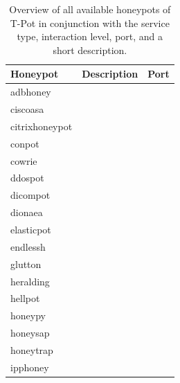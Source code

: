 \begin{table}
    \centering
    \caption[Overview honeypots of T-Pot]{Overview of all available honeypots of T-Pot in conjunction with the service type, interaction level, port, and a short description.}
    \begin{tabularx}{\linewidth}{l|l|l}
        \toprule
        \textbf{Honeypot}                        & \textbf{Description} & \textbf{Port} \\
        \hline
        adbhoney \cite{adbhoney2021}             &                      &               \\
        ciscoasa \cite{cymmetria2018}            &                      &               \\
        citrixhoneypot \cite{citrixhoneypot2020} &                      &               \\
        conpot \cite{conpot2021}                 &                      &               \\
        cowrie \cite{cowire2021}                 &                      &               \\
        ddospot \cite{ddosspot2021}              &                      &               \\
        dicompot \cite{dicompot2021}             &                      &               \\
        dionaea \cite{dionaea2021}               &                      &               \\
        elasticpot \cite{elasticpot2021}         &                      &               \\
        endlessh \cite{endlessh2021}             &                      &               \\
        glutton \cite{glutton2021}               &                      &               \\
        heralding \cite{heralding2021}           &                      &               \\
        hellpot \cite{hellpot2021}               &                      &               \\
        honeypy \cite{honeysap2021}              &                      &               \\
        honeysap \cite{honeysap2021}             &                      &               \\
        honeytrap \cite{honeytrap2021}           &                      &               \\
        ipphoney \cite{ipphoney2021}             &                      &               \\

\end{tabularx}
\end{table}
